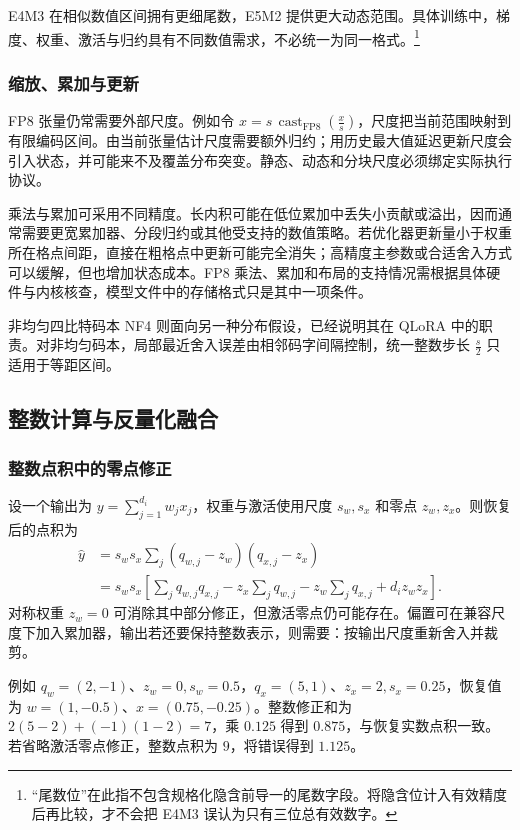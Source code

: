 \documentclass[../textbook.tex]{subfiles}
\begin{document}
E4M3 在相似数值区间拥有更细尾数，E5M2 提供更大动态范围。具体训练中，梯度、权重、激活与归约具有不同数值需求，不必统一为同一格式。\footnote{“尾数位”在此指不包含规格化隐含前导一的尾数字段。将隐含位计入有效精度后再比较，才不会把 E4M3 误认为只有三位总有效数字。}

\subsubsection{缩放、累加与更新}
FP8 张量仍常需要外部尺度。例如令 $\widehat x=s\,\operatorname{cast}_{\mathrm{FP8}}(\frac{x}{s})$，尺度把当前范围映射到有限编码区间。由当前张量估计尺度需要额外归约；用历史最大值延迟更新尺度会引入状态，并可能来不及覆盖分布突变。静态、动态和分块尺度必须绑定实际执行协议。

乘法与累加可采用不同精度。长内积可能在低位累加中丢失小贡献或溢出，因而通常需要更宽累加器、分段归约或其他受支持的数值策略。若优化器更新量小于权重所在格点间距，直接在粗格点中更新可能完全消失；高精度主参数或合适舍入方式可以缓解，但也增加状态成本。FP8 乘法、累加和布局的支持情况需根据具体硬件与内核核查，模型文件中的存储格式只是其中一项条件。

非均匀四比特码本 NF4 则面向另一种分布假设，已经说明其在 QLoRA 中的职责。对非均匀码本，局部最近舍入误差由相邻码字间隔控制，统一整数步长 $\frac{s}{2}$ 只适用于等距区间。

\subsection{整数计算与反量化融合}

\subsubsection{整数点积中的零点修正}
设一个输出为 $y=\sum_{j=1}^{d_i}w_jx_j$，权重与激活使用尺度 $s_w,s_x$ 和零点 $z_w,z_x$。则恢复后的点积为
\begin{align}
\widehat y
&=s_ws_x\sum_j(q_{w,j}-z_w)(q_{x,j}-z_x)\\
&=s_ws_x\left[\sum_jq_{w,j}q_{x,j}
-z_x\sum_jq_{w,j}-z_w\sum_jq_{x,j}+d_iz_wz_x\right].
\label{eq:opt-dot}
\end{align}
对称权重 $z_w=0$ 可消除其中部分修正，但激活零点仍可能存在。偏置可在兼容尺度下加入累加器，输出若还要保持整数表示，则需要：按输出尺度重新舍入并裁剪。

例如 $q_w=(2,-1)$、$z_w=0,s_w=0.5$，$q_x=(5,1)$、$z_x=2,s_x=0.25$，恢复值为 $w=(1,-0.5)$、$x=(0.75,-0.25)$。整数修正和为 $2(5-2)+(-1)(1-2)=7$，乘 $0.125$ 得到 $0.875$，与恢复实数点积一致。若省略激活零点修正，整数点积为 $9$，将错误得到 $1.125$。
\end{document}

